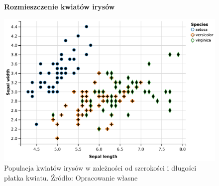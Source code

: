 \begin{figure}[b]
    \centering
    \textbf{Rozmieszczenie kwiatów irysów}\par\medskip
    \includegraphics[scale=0.7]{plotsepalwidthsepallength}
    \caption{Populacja kwiatów irysów w zależności od szerokości i długości płatka kwiatu. Źródło: Opracowanie własne}
    \label{fig:plotsepalwidthsepallength}
\end{figure}















